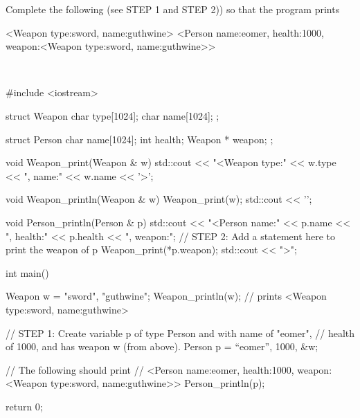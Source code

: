 \nextq
Complete the following (see STEP 1 and STEP 2))
so that the program prints
\begin{console}[fontsize=\footnotesize]
<Weapon type:sword, name:guthwine>
<Person name:eomer, health:1000, weapon:<Weapon type:sword, name:guthwine>>
\end{console}
\\
\ANSWER
\begin{answercode}
#include <iostream>

struct Weapon
{
    char type[1024];
    char name[1024];
};

struct Person
{
    char name[1024];
    int health;
    Weapon * weapon;
};

void Weapon_print(Weapon & w)
{
    std::cout << "<Weapon type:" << w.type << ", name:" << w.name << '>';
}

void Weapon_println(Weapon & w)
{
    Weapon_print(w);
    std::cout << '\n';
}

void Person_println(Person & p)
{
    std::cout << "<Person name:" << p.name
              << ", health:" << p.health
              << ", weapon:";
    // STEP 2: Add a statement here to print the weapon of p
    Weapon_print(*p.weapon);
    std::cout << ">\n";
}

int main()
{
    Weapon w = {"sword", "guthwine"};
    Weapon_println(w); // prints <Weapon type:sword, name:guthwine>

    // STEP 1: Create variable p of type Person and with name of "eomer",
    // health of 1000, and has weapon w (from above).
    Person p = {``eomer'', 1000, &w};

    // The following should print
    // <Person name:eomer, health:1000, weapon:<Weapon type:sword, name:guthwine>>
    Person_println(p);

    return 0;
}
\end{answercode}


